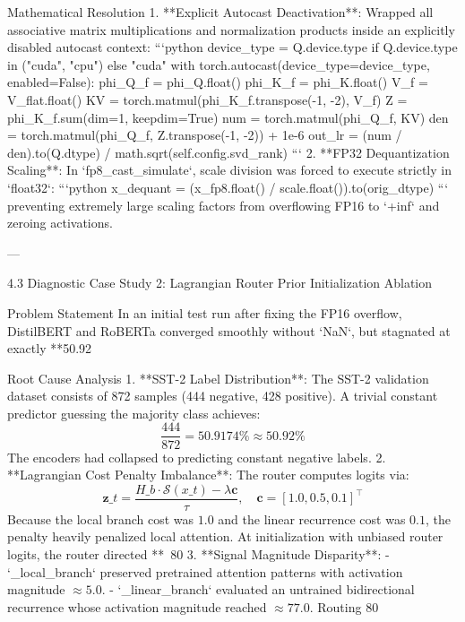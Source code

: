  Mathematical Resolution
1. **Explicit Autocast Deactivation**: Wrapped all associative matrix multiplications and normalization products inside an explicitly disabled autocast context:
   ```python
   device\_type = Q.device.type if Q.device.type in ("cuda", "cpu") else "cuda"
   with torch.autocast(device\_type=device\_type, enabled=False):
       phi\_Q\_f = phi\_Q.float()
       phi\_K\_f = phi\_K.float()
       V\_f = V\_flat.float()
       KV = torch.matmul(phi\_K\_f.transpose(-1, -2), V\_f)
       Z = phi\_K\_f.sum(dim=1, keepdim=True)
       num = torch.matmul(phi\_Q\_f, KV)
       den = torch.matmul(phi\_Q\_f, Z.transpose(-1, -2)) + 1e-6
       out\_lr = (num / den).to(Q.dtype) / math.sqrt(self.config.svd\_rank)
   ```
2. **FP32 Dequantization Scaling**: In `fp8\_cast\_simulate`, scale division was forced to execute strictly in `float32`:
   ```python
   x\_dequant = (x\_fp8.float() / scale.float()).to(orig\_dtype)
   ```
   preventing extremely large scaling factors from overflowing FP16 to `+inf` and zeroing activations.

---

 4.3 Diagnostic Case Study 2: Lagrangian Router Prior Initialization Ablation

 Problem Statement
In an initial test run after fixing the FP16 overflow, DistilBERT and RoBERTa converged smoothly without `NaN`, but stagnated at exactly **50.92%

 Root Cause Analysis
1. **SST-2 Label Distribution**: The SST-2 validation dataset consists of 872 samples (444 negative, 428 positive). A trivial constant predictor guessing the majority class achieves:
   $$\frac{444}{872} = 50.9174\% \approx 50.92\%$$
   The encoders had collapsed to predicting constant negative labels.
2. **Lagrangian Cost Penalty Imbalance**:
   The router computes logits via:
   $$\mathbf{z}\_t = \frac{H\_b \cdot \mathcal{S}(x\_t) - \lambda \mathbf{c}}{\tau}, \quad \mathbf{c} = [1.0, 0.5, 0.1]^\top$$
   Because the local branch cost was $1.0$ and the linear recurrence cost was $0.1$, the penalty heavily penalized local attention. At initialization with unbiased router logits, the router directed **~80%
3. **Signal Magnitude Disparity**:
   - `\_local\_branch` preserved pretrained attention patterns with activation magnitude $\approx 5.0$.
   - `\_linear\_branch` evaluated an untrained bidirectional recurrence whose activation magnitude reached $\approx \mathbf{77.0}$.
   Routing 80%

